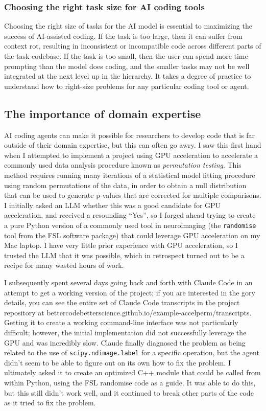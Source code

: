 \subsubsection{Choosing the right task size for AI coding tools}

Choosing the right size of tasks for the AI model is essential to maximizing the success of AI-assisted coding.  If the task is too large, then it can suffer from context rot, resulting in inconsistent or incompatible code across different parts of the task codebase.  If the task is too small, then the user can spend more time prompting than the model does coding, and the smaller tasks may not be well integrated at the next level up in the hierarchy.  It takes a degree of practice to understand how to right-size problems for any particular coding tool or agent.

\subsection{The importance of domain expertise}

AI coding agents can make it possible for researchers to develop code that is far outside of their domain expertise, but this can often go awry.
I saw this first hand when I attempted to implement a project using GPU acceleration to accelerate a commonly used data analysis procedure known as \textit{permutation testing}.
This method requires running many iterations of a statistical model fitting procedure using random permutations of the data, in order to obtain a null distribution that can be used to generate p-values that are corrected for multiple comparisons.
I initially asked an LLM whether this was a good candidate for GPU acceleration, and received a resounding ``Yes'', so I forged ahead trying to create a pure Python version of a commonly used tool in neuroimaging (the \texttt{randomise} tool from the FSL software package) that could leverage GPU acceleration on my Mac laptop.
I have very little prior experience with GPU acceleration, so I trusted the LLM that it was possible, which in retrospect turned out to be a recipe for many wasted hours of work.

I subsequently spent several days going back and forth with Claude Code in an attempt to get a working version of the project; if you are interested in the gory details, you can see the entire set of Claude Code transcripts in the project repository at bettercodebetterscience.github.io/example-accelperm/transcripts.
Getting it to create a working command-line interface was not particularly difficult; however, the initial implementation did not successfully leverage the GPU and was incredibly slow.
Claude finally diagnosed the problem as being related to the use of \texttt{scipy.ndimage.label} for a specific operation, but the agent didn't seem to be able to figure out on its own how to fix the problem.
I ultimately asked it to create an optimized C++ module that could be called from within Python, using the FSL randomise code as a guide.
It was able to do this, but this still didn't work well, and it continued to break other parts of the code as it tried to fix the problem.

